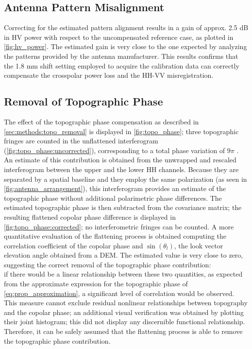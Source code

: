 \subsection{Antenna Pattern Misalignment}\label{sec:discussion:misalignment}
Correcting for the estimated pattern alignment results in a gain of approx. 2.5 dB  in HV power with respect to the uncompensated reference case, as plotted in \autoref{fig:hv_power}. The estimated gain is very close to the one expected by analyzing the patterns provided by the antenna manufacturer. This results confirms that the 1.8 mm shift setting employed to acquire the calibration data can correctly compensate the crosspolar power loss and the HH-VV misregistration.
\subsection{Removal of Topographic Phase}
The effect of the topographic phase compensation as described in \autoref{sec:methods:topo_removal} is displayed in \autoref{fig:topo_phase};
three topographic fringes are counted in the unflattened interferogram (\autoref{fig:topo_phase:uncorrected}), corresponding to a total phase variation of $9 \pi$ . An estimate of this contribution is obtained from the unwrapped and rescaled interferogram between the upper and the lower HH channels. Because they are separated by a spatial baseline and they employ the same polarization (as seen in \autoref{fig:antenna_arrangement}), this interferogram provides an estimate of the topographic phase without additional polarimetric phase differences. The estimated topographic phase is then subtracted from the covariance matrix; the resulting flattened copolar phase difference is displayed in \autoref{fig:topo_phase:corrected}; no interferometric fringes can be counted. A more quantitative evaluation of the flattening process is obtained computing the correlation coefficient of the copolar phase and $\sin{\left(\theta_l\right)}$, the look vector elevation angle obtained from a DEM. The estimated value is very close to zero, suggesting the correct removal of the topographic phase contribution:\\ if there would be a linear relationship between these two quantities, as expected from the approximate  expression for the topographic phase of \eqref{eq:prop_approximation}, a significant level of correlation would be observed. This measure cannot exclude  residual nonlinear relationships between topography and the copolar phase; an additional visual verification was obtained by plotting their joint histogram; this did  not display any discernible functional relationship. Therefore, it can be safely assumed that the flattening process is able to remove the topographic phase contribution.
